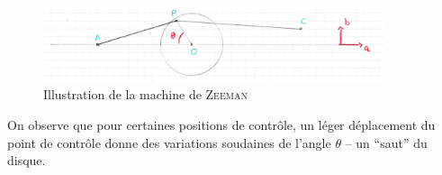 \documentclass{article}
\theoremstyle{definition}
\begin{document}
\begin{figure}[H]\centering \includegraphics[width=10cm, keepaspectratio]{images/zeeman_sketch.jpg}\caption{Illustration de la machine de \textsc{Zeeman}}\end{figure}

On observe que pour certaines positions de contrôle, un léger déplacement du point de contrôle donne des variations soudaines de l'angle $\theta$ -- un ``saut'' du disque.

%
\end{document}
